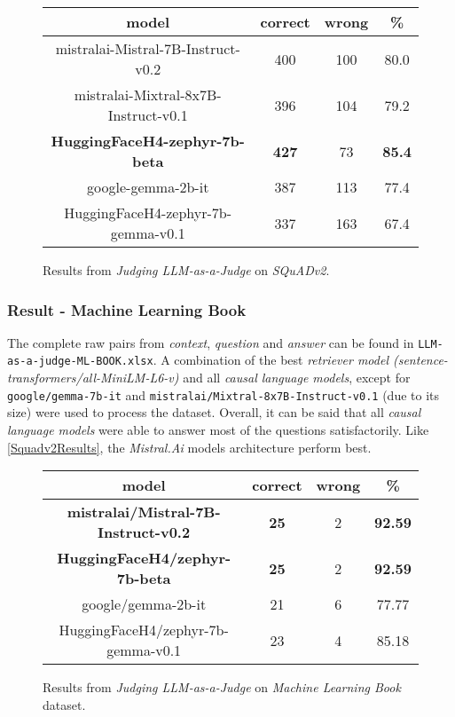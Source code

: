 \documentclass{article}
\begin{document}
\begin{figure}[H]
    \centering
\begin{tabular}{ |c|c|c|c|  }

\hline

model&correct &wrong& \%\\
\hline
\hline
mistralai-Mistral-7B-Instruct-v0.2&400&100&80.0\\
\hline
mistralai-Mixtral-8x7B-Instruct-v0.1&396&104&79.2\\
\hline
\textbf{HuggingFaceH4-zephyr-7b-beta}& \textbf{427}&73&\textbf{85.4}\\
\hline
google-gemma-2b-it& 387&113&77.4\\
\hline
HuggingFaceH4-zephyr-7b-gemma-v0.1& 337&163&67.4\\
\hline

\end{tabular}
\caption{Results from \textit{Judging LLM-as-a-Judge} on \textit{SQuADv2}.}
\label{JudgeSquadv2}
\end{figure}

\subsubsection{Result - Machine Learning Book}
The complete raw pairs from \textit{context}, \textit{question} and \textit{answer} can be found in \colorbox{green!25}{\lstinline{LLM-as-a-judge-ML-BOOK.xlsx}}.
A combination of the best \textit{retriever model (sentence-transformers/all-MiniLM-L6-v)} and all \textit{causal language models}, except for \colorbox{lightgray!25}{\lstinline{google/gemma-7b-it}} and \colorbox{lightgray!25}{\lstinline{mistralai/Mixtral-8x7B-Instruct-v0.1}} (due to its size) were used to process the dataset. Overall, it can be said that all \textit{causal language models} were able to answer most of the questions satisfactorily.
Like \cref{Squadv2Results}, the \textit{Mistral.Ai} models architecture perform best. 

\begin{figure}[H]
    \centering
\begin{tabular}{ |c|c|c|c|  }

\hline

model&correct &wrong& \%\\
\hline
\hline
\textbf{mistralai/Mistral-7B-Instruct-v0.2}&\textbf{25}&2&\textbf{92.59}\\
\hline
\textbf{HuggingFaceH4/zephyr-7b-beta}&\textbf{25}&2&\textbf{92.59}\\
\hline
google/gemma-2b-it&21&6&77.77\\
\hline
HuggingFaceH4/zephyr-7b-gemma-v0.1&23&4&85.18\\
\hline

\end{tabular}
\caption{Results from \textit{Judging LLM-as-a-Judge} on \textit{Machine Learning Book} dataset.}
\end{figure}
\end{document}

